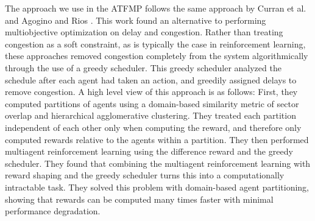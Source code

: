 \documentclass[letterpaper]{article}
\begin{document}


The approach we use in the ATFMP follows the same approach by Curran et al. \cite{Curran:2013:AHC:2484920.2485183} and Agogino and Rios \cite{Agogino:2009:EEM:1570256.1570258,Rios}. This work found an alternative to performing multiobjective optimization on delay and congestion. Rather than treating congestion as a soft constraint, as is typically the case in reinforcement learning, these approaches removed congestion completely from the system algorithmically through the use of a greedy scheduler. This greedy scheduler analyzed the schedule after each agent had taken an action, and greedily assigned delays to remove congestion. A high level view of this approach is as follows: First, they computed partitions of agents using a domain-based similarity metric of sector overlap and hierarchical agglomerative clustering. They treated each partition independent of each other only when computing the reward, and therefore only computed rewards relative to the agents within a partition. They then performed multiagent reinforcement learning using the difference reward and the greedy scheduler. They found that combining the multiagent reinforcement learning with reward shaping and the greedy scheduler turns this into a computationally intractable task. They solved this problem with domain-based agent partitioning, showing that rewards can be computed many times faster with minimal performance degradation.
\end{document}
